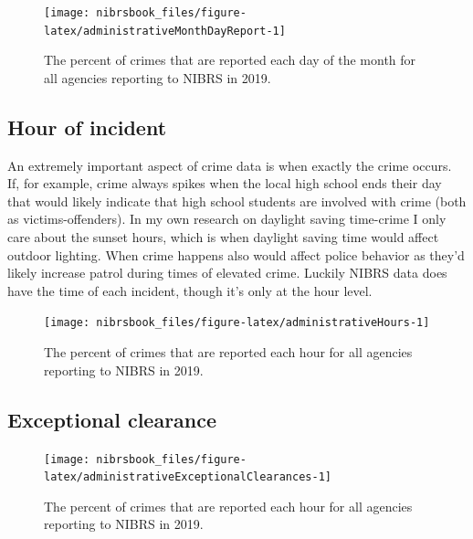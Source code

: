 \documentclass[
  12pt,
  openany]{book}
\begin{document}
\begin{figure}

{\centering \texttt{[image: nibrsbook\_files/figure-latex/administrativeMonthDayReport-1]} 

}

\caption{The percent of crimes that are reported each day of the month for all agencies reporting to NIBRS in 2019.}\label{fig:administrativeMonthDayReport}
\end{figure}

\hypertarget{hour-of-incident}{%
\subsection{Hour of incident}\label{hour-of-incident}}

An extremely important aspect of crime data is when exactly the crime occurs. If, for example, crime always spikes when the local high school ends their day that would likely indicate that high school students are involved with crime (both as victims-offenders). In my own research on daylight saving time-crime I only care about the sunset hours, which is when daylight saving time would affect outdoor lighting. When crime happens also would affect police behavior as they'd likely increase patrol during times of elevated crime. Luckily NIBRS data does have the time of each incident, though it's only at the hour level.

\begin{figure}

{\centering \texttt{[image: nibrsbook\_files/figure-latex/administrativeHours-1]} 

}

\caption{The percent of crimes that are reported each hour for all agencies reporting to NIBRS in 2019.}\label{fig:administrativeHours}
\end{figure}

\hypertarget{exceptional-clearance}{%
\subsection{Exceptional clearance}\label{exceptional-clearance}}

\begin{figure}

{\centering \texttt{[image: nibrsbook\_files/figure-latex/administrativeExceptionalClearances-1]} 

}

\caption{The percent of crimes that are reported each hour for all agencies reporting to NIBRS in 2019.}\label{fig:administrativeExceptionalClearances}
\end{figure}
\end{document}
